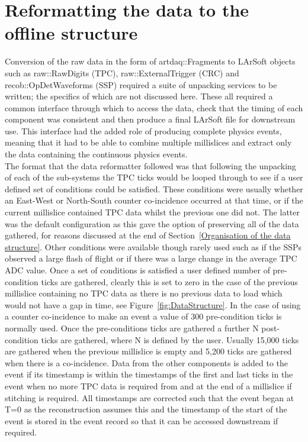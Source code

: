 \section{Reformatting the data to the offline structure} \label{Reformatting the data to the offline structure} %
Conversion of the raw data in the form of artdaq::Fragments to LArSoft objects such as raw::RawDigits (TPC), raw::ExternalTrigger (CRC) and recob::OpDetWaveforms (SSP) required a suite of unpacking services to be written; the specifics of which are not discussed here. These all required a common interface through which to access the data, check that the timing of each component was consistent and then produce a final LArSoft file for downstream use. This interface had the added role of producing complete physics events, meaning that it had to be able to combine multiple millislices and extract only the data containing the continuous physics events. \\

The format that the data reformatter followed was that following the unpacking of each of the sub-systems the TPC ticks would be looped through to see if a user defined set of conditions could be satisfied. These conditions were usually whether an East-West or North-South counter co-incidence occurred at that time, or if the current millislice contained TPC data whilst the previous one did not. The latter was the default configuration as this gave the option of preserving all of the data gathered, for reasons discussed at the end of Section~\ref{Organisation of the data structure}. Other conditions were available though rarely used such as if the SSPs observed a large flash of flight or if there was a large change in the average TPC ADC value. Once a set of conditions is satisfied a user defined number of pre-condition ticks are gathered, clearly this is set to zero in the case of the previous millislice containing no TPC data as there is no previous data to load which would not have a gap in time, see Figure~\ref{fig:DataStructure}. In the case of using a counter co-incidence to make an event a value of 300 pre-condition ticks is normally used. Once the pre-conditions ticks are gathered a further N post-condition ticks are gathered, where N is defined by the user. Usually 15,000 ticks are gathered when the previous millislice is empty and 5,200 ticks are gathered when there is a co-incidence. Data from the other components is added to the event if its timestamp is within the timestamps of the first and last ticks in the event when no more TPC data is required from and at the end of a millislice if stitching is required. All timestamps are corrected such that the event began at T=0 as the reconstruction assumes this and the timestamp of the start of the event is stored in the event record so that it can be accessed downstream if required. \\

